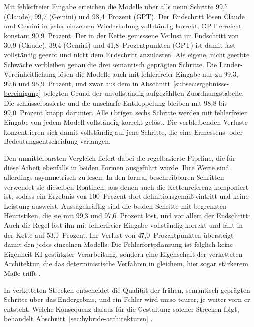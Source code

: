 Mit fehlerfreier Eingabe erreichen die Modelle über alle neun Schritte 99,7 (Claude), 99,7 (Gemini) und 98,4~Prozent (GPT). Den Endschritt lösen Claude und Gemini in jeder einzelnen Wiederholung vollständig korrekt, GPT erreicht konstant 90,9~Prozent. Der in der Kette gemessene Verlust im Endschritt von 30,9 (Claude), 39,4 (Gemini) und 41,8~Prozentpunkten (GPT) ist damit fast vollständig geerbt und nicht dem Endschritt anzulasten. Als eigene, nicht geerbte Schwäche verbleiben genau die drei semantisch geprägten Schritte. Die Länder-Vereinheitlichung lösen die Modelle auch mit fehlerfreier Eingabe nur zu 99,3, 99,6 und 95,9~Prozent, und zwar aus dem in Abschnitt~\ref{subsec:ergebnisse-bereinigung} belegten Grund der unvollständig aufgezählten Zuordnungstabelle. Die schlüsselbasierte und die unscharfe Entdoppelung bleiben mit 98,8 bis 99,0~Prozent knapp darunter. Alle übrigen sechs Schritte werden mit fehlerfreier Eingabe von jedem Modell vollständig korrekt gelöst. Die verbleibenden Verluste konzentrieren sich damit vollständig auf jene Schritte, die eine Ermessens- oder Bedeutungsentscheidung verlangen.

Den unmittelbarsten Vergleich liefert dabei die regelbasierte Pipeline, die für diese Arbeit ebenfalls in beiden Formen ausgeführt wurde. Ihre Werte sind allerdings asymmetrisch zu lesen: In den formal beschreibbaren Schritten verwendet sie dieselben Routinen, aus denen auch die Kettenreferenz komponiert ist, sodass ein Ergebnis von 100~Prozent dort definitionsgemäß eintritt und keine Leistung ausweist. Aussagekräftig sind die beiden Schritte mit begrenzten Heuristiken, die sie mit 99,3 und 97,6~Prozent löst, und vor allem der Endschritt: Auch die Regel löst ihn mit fehlerfreier Eingabe vollständig korrekt und fällt in der Kette auf 53,0~Prozent. Ihr Verlust von 47,0~Prozentpunkten übersteigt damit den jedes einzelnen Modells. Die Fehlerfortpflanzung ist folglich keine Eigenheit \ac{KI}-gestützter Verarbeitung, sondern eine Eigenschaft der verketteten Architektur, die das deterministische Verfahren in gleichem, hier sogar stärkerem Maße trifft \autocite{ridzuanReviewDataQuality2024,walhaDataIntegrationTraditional2024}.

In verketteten Strecken entscheidet die Qualität der frühen, semantisch geprägten Schritte über das Endergebnis, und ein Fehler wird umso teurer, je weiter vorn er entsteht. Welche Konsequenz daraus für die Gestaltung solcher Strecken folgt, behandelt Abschnitt~\ref{sec:hybride-architekturen} \autocite{ridzuanReviewDataQuality2024}.

